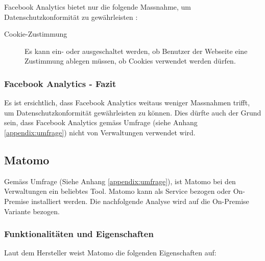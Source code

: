 Facebook Analytics bietet nur die folgende Massnahme, um Datenschutzkonformität zu gewährleisten \parencite{facebookAnalyticsGDPR}: 

\begin{description}
  \item[Cookie-Zustimmung] Es kann ein- oder ausgeschaltet werden, ob Benutzer der Webseite eine Zustimmung ablegen müssen, ob Cookies verwendet werden dürfen.
\end{description}

\subsubsection{Facebook Analytics - Fazit}
Es ist ersichtlich, dass Facebook Analytics weitaus weniger Massnahmen trifft, um Datenschutzkonformität gewährleisten zu können. Dies dürfte auch der Grund sein, dass Facebook Analytics gemäss Umfrage (siehe Anhang \ref{appendix:umfrage}) nicht von Verwaltungen verwendet wird.

\newpage

\subsection{Matomo} \label{subsec:matomomarkt}

Gemäss Umfrage (Siehe Anhang \ref{appendix:umfrage}), ist Matomo bei den Verwaltungen ein beliebtes Tool. Matomo kann als Service bezogen oder On-Premise installiert werden. Die nachfolgende Analyse wird auf die On-Premise Variante bezogen.

\subsubsection{Funktionalitäten und Eigenschaften}
Laut dem Hersteller weist Matomo die folgenden Eigenschaften auf:

